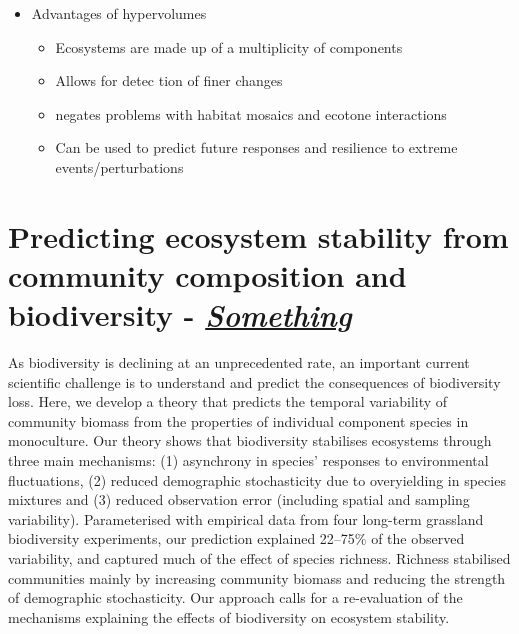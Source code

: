 \documentclass[11pt]{article}
\begin{document}
\begin{itemize}
		\item Advantages of hypervolumes
		\begin{itemize}
			\item Ecosystems are made up of a multiplicity of components
			\item Allows for detec tion of finer changes
			\item negates problems with habitat mosaics and ecotone interactions
			\item Can be used to predict future responses and resilience to extreme events/perturbations
		\end{itemize}
	\end{itemize}
	
	\section*{Predicting ecosystem stability from community composition and biodiversity \citep{DeMazancourt2013} - \underline{\textit{Something}}}
	
	As biodiversity is declining at an unprecedented rate, an important current scientific challenge is to understand and predict the consequences of biodiversity loss. Here, we develop a theory that predicts the temporal variability of community biomass from the properties of individual component species in monoculture. Our theory shows that biodiversity stabilises ecosystems through three main mechanisms: (1) asynchrony in species’ responses to environmental fluctuations, (2) reduced demographic stochasticity due to overyielding in species mixtures and (3) reduced observation error (including spatial and sampling variability). Parameterised with empirical data from four long-term grassland biodiversity experiments, our prediction explained 22–75\% of the observed variability, and captured much of the effect of species richness. Richness stabilised communities mainly by increasing community biomass and reducing the strength of demographic stochasticity. Our approach calls for a re-evaluation of the mechanisms explaining the effects of biodiversity on ecosystem stability.
	
\end{document}
